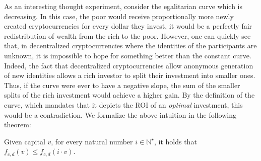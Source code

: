 As an interesting thought experiment, consider the egalitarian curve which is
decreasing. In this case, the poor would receive proportionally more newly
created cryptocurrencies for every dollar they invest, \ie it would be a
perfectly fair redistribution of wealth from the rich to the poor. However, one
can quickly see that, in decentralized cryptocurrencies where the identities of
the participants are unknown, it is impossible to
hope for something better than the constant curve. Indeed, the fact that
decentralized cryptocurrencies allow anonymous generation of new identities
allows a rich investor to split their investment into smaller ones.  Thus, if
the curve were ever to have a negative slope, the sum of the smaller splits of
the rich investment would achieve a higher gain. By the definition of the
curve, which mandates that it depicts the ROI of an \emph{optimal} investment,
this would be a contradiction. We formalize the above intuition in the following
theorem:

\begin{theorem}\label{thm:sybil}
    Given capital $v$, for every natural number $i \in \mathbb{N}^\star$, it
    holds that $f_{c,d}(v) \leq f_{c,d}(i \cdot v)$.
\end{theorem}

